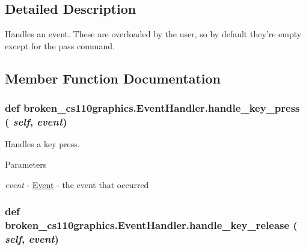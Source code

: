 \subsection{Detailed Description}
Handles an event. These are overloaded by the user, so by default they're empty except for the pass command. 

\subsection{Member Function Documentation}
\hypertarget{classbroken__cs110graphics_1_1EventHandler_a81f3281ba7b309b800ec5e37fb42b182}{
\subsubsection[{handle\_\-key\_\-press}]{\setlength{\rightskip}{0pt plus 5cm}def broken\_\-cs110graphics.EventHandler.handle\_\-key\_\-press ( {\em self}, \/   {\em event})}}
\label{classbroken__cs110graphics_1_1EventHandler_a81f3281ba7b309b800ec5e37fb42b182}


Handles a key press. 
\begin{DoxyParams}{Parameters}
\item[{\em event}]-\/ \hyperlink{classbroken__cs110graphics_1_1Event}{Event} -\/ the event that occurred \end{DoxyParams}
\hypertarget{classbroken__cs110graphics_1_1EventHandler_ac9a757b4108de84c85211c05dec7ce46}{
\subsubsection[{handle\_\-key\_\-release}]{\setlength{\rightskip}{0pt plus 5cm}def broken\_\-cs110graphics.EventHandler.handle\_\-key\_\-release ( {\em self}, \/   {\em event})}}
\label{classbroken__cs110graphics_1_1EventHandler_ac9a757b4108de84c85211c05dec7ce46}


